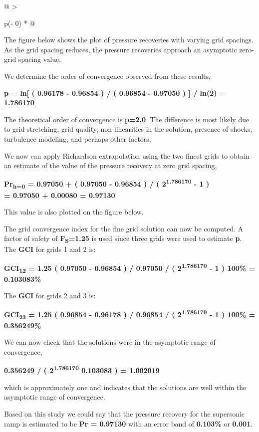 \begin{longtable}[]{@{}
  >{\raggedright\arraybackslash}p{(\columnwidth - 0\tabcolsep) * }@{}}
\begin{minipage}[t]{\linewidth}
The figure below shows the plot of pressure recoveries with varying grid
spacings. As the grid spacing reduces, the pressure recoveries approach
an asymptotic zero-grid spacing value.

We determine the order of convergence observed from these results,

\textbf{p = ln{[} ( 0.96178 - 0.96854 ) / ( 0.96854 - 0.97050 ) {]} /
ln(2) = 1.786170}

The theoretical order of convergence is \textbf{p=2.0}. The difference
is most likely due to grid stretching, grid quality, non-linearities in
the solution, presence of shocks, turbulence modeling, and perhaps other
factors.

We now can apply Richardson extrapolation using the two finest grids to
obtain an estimate of the value of the pressure recovery at zero grid
spacing,

\textbf{Pr\textsubscript{h=0} = 0.97050 + ( 0.97050 - 0.96854 ) / (
2\textsuperscript{1.786170} - 1 )\\
= 0.97050 + 0.00080 = 0.97130}

This value is also plotted on the figure below.

The grid convergence index for the fine grid solution can now be
computed. A factor of safety of \textbf{F\textsubscript{S}=1.25} is used
since three grids were used to estimate \textbf{p}. The \textbf{GCI} for
grids 1 and 2 is:

\textbf{GCI\textsubscript{12} = 1.25 \textbar{} ( 0.97050 - 0.96854 ) /
0.97050 \textbar{} / ( 2\textsuperscript{1.786170} - 1 ) 100\% =
0.103083\%}

The \textbf{GCI} for grids 2 and 3 is:

\textbf{GCI\textsubscript{23} = 1.25 \textbar{} ( 0.96854 - 0.96178 ) /
0.96854 \textbar{} / ( 2\textsuperscript{1.786170} - 1 ) 100\% =
0.356249\%}

We can now check that the solutions were in the asymptotic range of
convergence,

\textbf{0.356249 / ( 2\textsuperscript{1.786170} 0.103083 ) = 1.002019}

which is approximately one and indicates that the solutions are well
within the asymptotic range of convergence.

Based on this study we could say that the pressure recovery for the
supersonic ramp is estimated to be \textbf{Pr = 0.97130} with an error
band of \textbf{0.103\%} or \textbf{0.001}.



\end{minipage}
\end{longtable}
